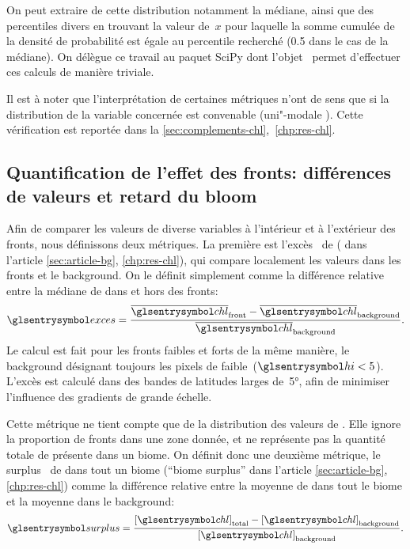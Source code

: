 On peut extraire de cette distribution notamment la médiane, ainsi que des percentiles divers en trouvant la valeur de~\(x\) pour laquelle la somme cumulée de la densité de probabilité est égale au percentile recherché (\num{0.5} dans le cas de la médiane).
On délègue ce travail au paquet SciPy dont l'objet~ permet d'effectuer ces calculs de manière triviale.

Il est à noter que l'interprétation de certaines métriques n'ont de sens que si la distribution de la variable concernée est convenable (uni"-modale ).
Cette vérification est reportée dans la \cref{sec:complements-chl},~\cref*{chp:res-chl}.

\subsection{Quantification de l'effet des fronts: différences de valeurs et retard du bloom}
\label{sec:extraction-surplus-lag}

Afin de comparer les valeurs de diverse variables à l'intérieur et à l'extérieur des fronts, nous définissons deux métriques.
La première est l'excès~ de  ( dans l'article \cref{sec:article-bg}, \cref*{chp:res-chl}), qui compare localement les valeurs dans les fronts et le background. On le définit simplement comme la différence relative entre la médiane de  dans et hors des fronts:
\begin{equation}
  \am{exces} = \frac{\med{\am{chl}}_\frt - \med{\am{chl}}_\bkg}
  {\med{\am{chl}}_\bkg} .
\end{equation}
Le calcul est fait pour les fronts faibles et forts de la même manière, le background désignant toujours les pixels de  faible~(\(\am{hi} < 5\)).
L'excès est calculé dans des bandes de latitudes larges de~\ang{5}, afin de minimiser l'influence des gradients de grande échelle.

Cette métrique ne tient compte que de la distribution des valeurs de . Elle ignore la proportion de fronts dans une zone donnée, et ne représente pas la quantité totale de  présente dans un biome.
On définit donc une deuxième métrique, le surplus~ de  dans tout un biome (\enquote{biome surplus} dans l'article \cref{sec:article-bg}, \cref*{chp:res-chl}) comme la différence relative entre la moyenne de  dans tout le biome et la moyenne dans le background:
\begin{equation}
  \am{surplus} = \frac{\moy{\am{chl}}_\tot - \moy{\am{chl}}_\bkg}
  {\moy{\am{chl}}_\bkg} .
\end{equation}

